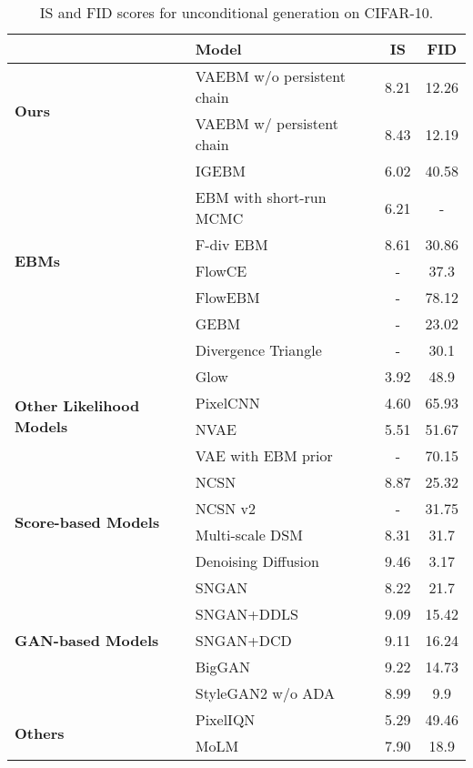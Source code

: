 \documentclass{article} \usepackage{iclr2021_conference,times}
\begin{document}
\begin{table}[t]
\small
\caption{IS and FID scores for unconditional generation on CIFAR-10.
}
\label{table cifar}
\centering
\begin{tabular}{llcc}
& Model & IS & FID
\\ \hline
\multirow{2}{*}{\textbf{Ours}}&VAEBM w/o persistent chain  & 8.21& 12.26\\
&VAEBM w/ persistent chain & 8.43 & 12.19\\
\hline
\multirow{7}{*}{\textbf{EBMs}} & IGEBM \citep{du2019implicit} & 6.02 & 40.58\\
&EBM with short-run MCMC \citep{nijkamp2019learning} & 6.21 & - \\
&F-div EBM \citep{yu2020training} & 8.61 & 30.86\\
&FlowCE \citep{gao2020flow} & - & 37.3\\
&FlowEBM \citep{nijkamp2020learning} &- & 78.12\\
&GEBM \citep{Arbel2020GeneralizedEB} & - & 23.02\\
&Divergence Triangle \citep{han2020joint} & - & 30.1 \\
\hline
\multirow{4}{2cm}{\textbf{Other Likelihood Models}}&Glow \citep{kingma2018glow} & 3.92 & 48.9 \\
&PixelCNN \citep{oord2016pixel} & 4.60 & 65.93\\
&NVAE \citep{vahdat2020nvae} & 5.51 & 51.67\\
& VAE with EBM prior \citep{pang2020learning} & - & 70.15\\
\hline
\hline
\multirow{4}{2cm}{\textbf{Score-based Models}}&NCSN \citep{song2019generative} &8.87 & 25.32\\
&NCSN v2 \citep{song2020improved} & - & 31.75\\
&Multi-scale DSM \citep{li2019annealed} & 8.31& 31.7\\
&Denoising Diffusion \citep{ho2020denoising} & 9.46 &3.17 \\ 
\hline
\multirow{5}{2cm}{\textbf{GAN-based Models}} &SNGAN \citep{miyato2018spectral} & 8.22 & 21.7 \\ 
&SNGAN+DDLS \citep{che2020your} & 9.09 & 15.42 \\
&SNGAN+DCD \citep{song2020discriminator} & 9.11& 16.24\\
&BigGAN \citep{brock2018large} & 9.22 & 14.73 \\ 
&StyleGAN2 w/o ADA \citep{karras2020training} & 8.99 & 9.9\\
\hline
\multirow{2}{*}{\textbf{Others}}&PixelIQN \citep{ostrovski2018autoregressive} &5.29 & 49.46\\
& MoLM \citep{ravuri2018learning} & 7.90 & 18.9 \\
\hline
\end{tabular}
\end{table}
\end{document}
